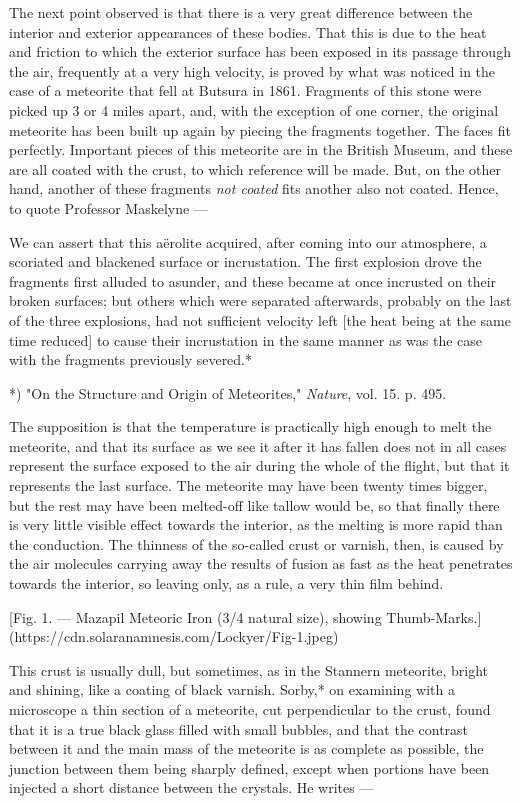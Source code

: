 \documentclass[a4paper, 12pt, oneside, polutonikogreek, english]{article}
\begin{document}
The next point observed is that there is a very great difference between the interior and exterior appearances of these bodies. That this is due to the heat and friction to which the exterior surface has been exposed in its passage through the air, frequently at a very high velocity, is proved by what was noticed in the case of a meteorite that fell at Butsura in 1861. Fragments of this stone were picked up 3 or 4 miles apart, and, with the exception of one corner, the original meteorite has been built up again by piecing the fragments together. The faces fit perfectly. Important pieces of this meteorite are in the British Museum, and these are all coated with the crust, to which reference will be made. But, on the other hand, another of these fragments \emph{not coated} fits another also not coated. Hence, to quote Professor Maskelyne ---

We can assert that this aërolite acquired, after coming into our atmosphere, a scoriated and blackened surface or incrustation. The first explosion drove the fragments first alluded to asunder, and these became at once incrusted on their broken surfaces; but others which were separated afterwards, probably on the last of the three explosions, had not sufficient velocity left [the heat being at the same time reduced] to cause their incrustation in the same manner as was the case with the fragments previously severed.*

*) "On the Structure and Origin of Meteorites," \emph{Nature}, vol. 15. p. 495.

The supposition is that the temperature is practically high enough to melt the meteorite, and that its surface as we see it after it has fallen does not in all cases represent the surface exposed to the air during the whole of the flight, but that it represents the last surface. The meteorite may have been twenty times bigger, but the rest may have been melted-off like tallow would be, so that finally there is very little visible effect towards the interior, as the melting is more rapid than the conduction. The thinness of the so-called crust or varnish, then, is caused by the air molecules carrying away the results of fusion as fast as the heat penetrates towards the interior, so leaving only, as a rule, a very thin film behind.

[Fig. 1. --- Mazapil Meteoric Iron (3/4 natural size), showing Thumb-Marks.](https://cdn.solaranamnesis.com/Lockyer/Fig-1.jpeg)

This crust is usually dull, but sometimes, as in the Stannern meteorite, bright and shining, like a coating of black varnish. Sorby,* on examining with a microscope a thin section of a meteorite, cut perpendicular to the crust, found that it is a true black glass filled with small bubbles, and that the contrast between it and the main mass of the meteorite is as complete as possible, the junction between them being sharply defined, except when portions have been injected a short distance between the crystals. He writes ---
\end{document}
